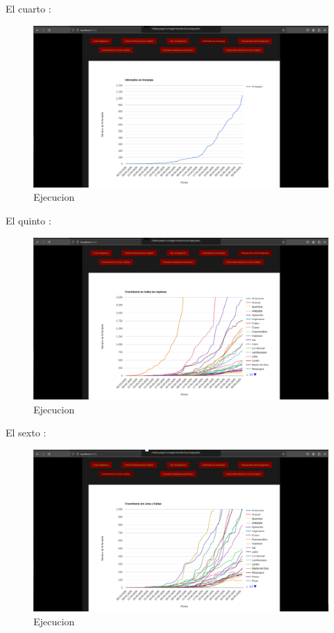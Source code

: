 El cuarto :
\begin{figure}[H]
  \centering
  \includegraphics[width=1.0\textwidth]{img/Ej4.png}
  \caption{Ejecucion}
\end{figure}
El quinto :
\begin{figure}[H]
  \centering
  \includegraphics[width=1.0\textwidth]{img/Ej5.png}
  \caption{Ejecucion}
\end{figure}
El sexto :
\begin{figure}[H]
  \centering
  \includegraphics[width=1.0\textwidth]{img/Ej6.png}
  \caption{Ejecucion}
\end{figure}
